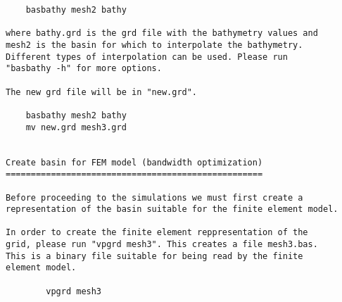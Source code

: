 \begin{verbatim}
	basbathy mesh2 bathy

where bathy.grd is the grd file with the bathymetry values and
mesh2 is the basin for which to interpolate the bathymetry.
Different types of interpolation can be used. Please run
"basbathy -h" for more options.

The new grd file will be in "new.grd".

	basbathy mesh2 bathy
	mv new.grd mesh3.grd


Create basin for FEM model (bandwidth optimization)
===================================================

Before proceeding to the simulations we must first create a 
representation of the basin suitable for the finite element model. 

In order to create the finite element reppresentation of the
grid, please run "vpgrd mesh3". This creates a file mesh3.bas.
This is a binary file suitable for being read by the finite
element model.

        vpgrd mesh3

\end{verbatim}













